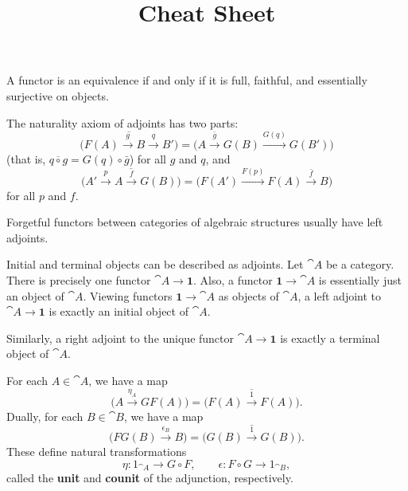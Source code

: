 \documentclass[11pt,a4paper]{article}
\author{}
\date{}
\title{Cheat Sheet}
\begin{document}
\maketitle
\begin{proposition}
    A functor is an equivalence if and only if it is full, faithful, and essentially surjective on objects.
\end{proposition}

The naturality axiom of adjoints has two parts:
\begin{equation}\label{eq:naturality1}
    \overline{\big( F(A)\xrightarrow{g} B\xrightarrow{q} B' \big)} = \big( A\xrightarrow{\bar{g}} G(B) \xrightarrow{G(q)} G(B') \big)
\end{equation}
(that is, $\overline{q\circ g}=G(q)\circ\bar{g}$) for all $g$ and $q$, and
\begin{equation}\label{eq:naturality2}
    \overline{\big(A' \xrightarrow{p} A \xrightarrow{f} G(B) \big)} = \big(F(A') \xrightarrow{F(p)} F(A) \xrightarrow{\bar{f}} B\big)
\end{equation}
for all $p$ and $f$.\par

Forgetful functors between categories of algebraic structures usually have left adjoints.

\begin{example}
    Initial and terminal objects can be described as adjoints. Let $\cat{A}$ be a category. There is precisely one functor $\cat{A} \to \textbf{1}$. Also, a functor $ \textbf{1}\to\cat{A}$ is essentially just an object of $\cat{A}$. Viewing functors $ \textbf{1}\to\cat{A}$ as objects of $\cat{A}$, a left adjoint to $\cat{A}\to \textbf{1}$ is exactly an initial object of $\cat{A}$.\par
    Similarly, a right adjoint to the unique functor $\cat{A}\to \textbf{1}$ is exactly a terminal object of $\cat{A}$.
\end{example}

For each $A\in\cat{A}$, we have a map
\begin{equation}\label{eq:eta}
    \big(A\xrightarrow{\eta_A} GF(A)\big) = \overline{\big(F(A)\xrightarrow{1} F(A)\big)}.
\end{equation}
Dually, for each $B\in\cat{B}$, we have a map
\begin{equation}\label{eq:eps}
    \big(FG(B)\xrightarrow{\epsilon_B} B\big) = \overline{\big(G(B)\xrightarrow{1} G(B)\big)}.
\end{equation}
These define natural transformations
\begin{equation*}
    \eta: 1_{\cat{A}}\to G\circ F,\qquad\epsilon: F\circ G\to 1_{\cat{B}},
\end{equation*}
called the \textbf{unit} and \textbf{counit} of the adjunction, respectively.
\end{document}
